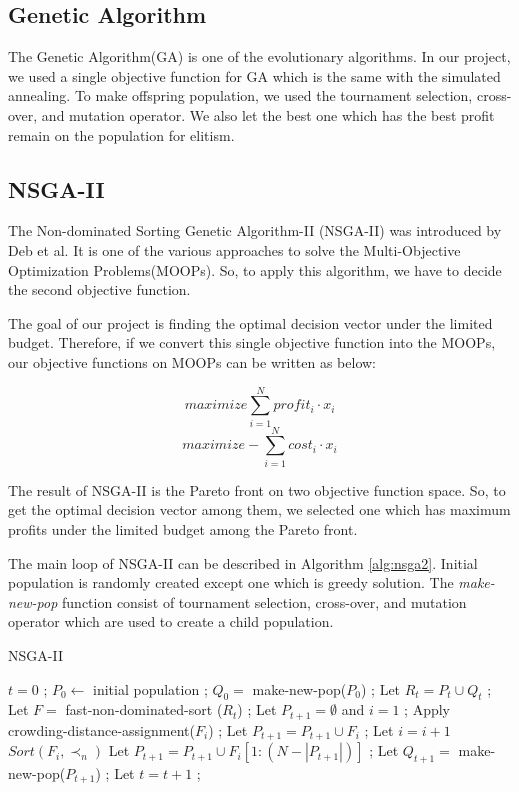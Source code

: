 \subsection{Genetic Algorithm}
The Genetic Algorithm(GA) is one of the evolutionary algorithms. In our project, we used a single objective function for GA which is the same with the simulated annealing. To make offspring population, we used the tournament selection, cross-over, and mutation operator. We also let the best one which has the best profit remain on the population for elitism.

\subsection{NSGA-II}
The Non-dominated Sorting Genetic Algorithm-II (NSGA-II) was introduced by Deb et al.\cite{NSGA2} It is one of the various approaches to solve the Multi-Objective Optimization Problems(MOOPs). So, to apply this algorithm, we have to decide the second objective function. 

The goal of our project is finding the optimal decision vector under the limited budget. Therefore, if we convert this single objective function into the MOOPs, our objective functions on MOOPs can be written as below:

\[
maximize \sum_{i = 1}^{N} profit_i \cdot x_i
\]
\[
maximize -\sum_{i = 1}^{N} cost_i \cdot x_i
\]

The result of NSGA-II is the Pareto front on two objective function space. So, to get the optimal decision vector among them, we selected one which has maximum profits under the limited budget among the Pareto front.

The main loop of NSGA-II can be described in Algorithm \ref{alg:nsga2}. Initial population is randomly created except one which is greedy solution. The \textit{make-new-pop} function consist of tournament selection, cross-over, and mutation operator which are used to create a child population.

\begin{algorithm}
\caption{NSGA-II}\label{alg:nsga2}
\begin{algorithmic}
    \State $t = 0$ ;
    \State $P_0 \gets$ initial population ;
    \State $Q_0 =$ make-new-pop($P_0$) ;
        \State Let $R_t = P_t \cup Q_t$ ;
        \State Let $F = $ fast-non-dominated-sort ($R_t$) ; %
        \State Let $P_{t+1} = \emptyset$ and $i = 1$ ;
            \State Apply crowding-distance-assignment($F_i$) ; %
            \State Let $P_{t+1} = P_{t+1} \cup F_i$ ;
            \State Let $i = i + 1$
        \EndWhile
        \State $Sort(F_i, \prec_n)$
        \State Let $P_{t+1} = P_{t+1} \cup F_i[1:(N - |P_{t+1}|)]$ ;
        \State Let $Q_{t+1} = $ make-new-pop($P_{t+1}$) ;
        \State Let $t = t + 1$ ;
    \EndWhile
\end{algorithmic}
\end{algorithm}


